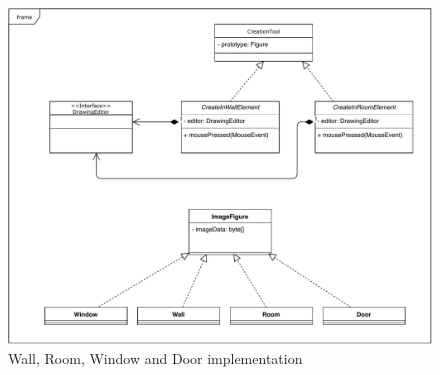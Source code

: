 \begin{figure}[h]
    \includegraphics[keepaspectratio,width=\textwidth]{images/uml.pdf}
    \caption{Wall, Room, Window and Door implementation}
\end{figure}